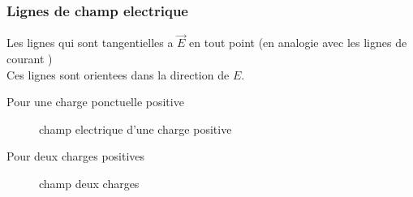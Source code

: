 \documentclass[../main.tex]{subfiles}
\begin{document}
\subsubsection{Lignes de champ electrique}
Les lignes qui sont tangentielles a $\vec{E}$ en tout point (en analogie avec les lignes de courant )\\
Ces lignes sont orientees dans la direction de $E$.\\
\begin{exemple}
Pour une charge ponctuelle positive
\begin{figure}[H]
    \centering
    \caption{champ electrique d'une charge positive}
    \label{fig:champ-electrique-d'une-charge-positive}
\end{figure}
\end{exemple}
\begin{exemple}
Pour deux charges positives
\begin{figure}[H]
    \centering
    \caption{champ deux charges}
    \label{fig:champ-deux-charges}
\end{figure}
\end{exemple}






	
\end{document}
